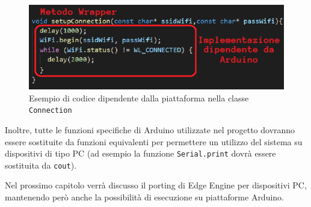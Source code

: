 \begin{figure}[H]
	\centering
	\includegraphics[width=\linewidth]{pics/arduinodependent}
	\caption{Esempio di codice dipendente dalla piattaforma nella classe \texttt{Connection}}
	\label{arduinodep}
\end{figure}

Inoltre, tutte le funzioni specifiche di Arduino utilizzate nel progetto dovranno essere sostituite da funzioni equivalenti per permettere un utilizzo del sistema su dispositivi di tipo PC (ad esempio la funzione \texttt{Serial.print} dovrà essere sostituita da \texttt{cout}).

Nel prossimo capitolo verrà discusso il porting di Edge Engine per dispositivi PC, mantenendo però anche la possibilità di esecuzione su piattaforme Arduino.
